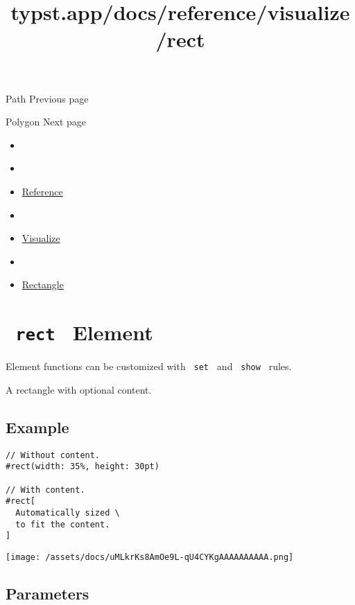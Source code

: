 { Path } { Previous page }

\href{/docs/reference/visualize/polygon/}{\pandocbounded{}}

{ Polygon } { Next page }


\title{typst.app/docs/reference/visualize/rect}

\begin{itemize}
\tightlist
\item
  \href{/docs}{}
\item
  
\item
  \href{/docs/reference/}{Reference}
\item
  
\item
  \href{/docs/reference/visualize/}{Visualize}
\item
  
\item
  \href{/docs/reference/visualize/rect/}{Rectangle}
\end{itemize}

\section{\texorpdfstring{\texttt{\ rect\ } {{ Element
}}}{ rect   Element }}\label{summary}

\label{element-tooltip}
Element functions can be customized with \texttt{\ set\ } and
\texttt{\ show\ } rules.

A rectangle with optional content.

\subsection{Example}\label{example}

\begin{verbatim}
// Without content.
#rect(width: 35%, height: 30pt)

// With content.
#rect[
  Automatically sized \
  to fit the content.
]
\end{verbatim}

\texttt{[image: /assets/docs/uMLkrKs8AmOe9L-qU4CYKgAAAAAAAAAA.png]}

\subsection{\texorpdfstring{{ Parameters
}}{ Parameters }}\label{parameters}

